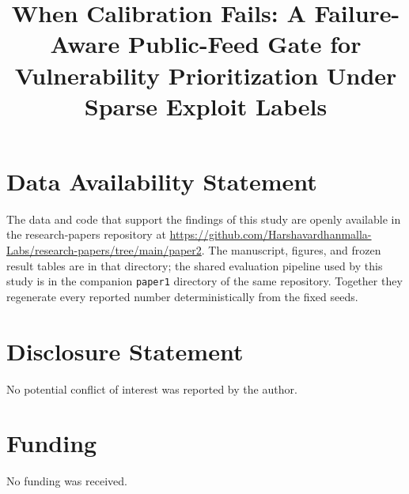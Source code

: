 \documentclass[journal]{IEEEtran}
\title{When Calibration Fails: A Failure-Aware Public-Feed Gate for
Vulnerability Prioritization Under Sparse Exploit Labels}
\author{%
  \IEEEauthorblockN{Harshavardhan Malla}
  \IEEEauthorblockA{Independent Researcher\\
  harshavardhanmalla75@gmail.com}%
}
\begin{document}
\maketitle





















\section*{Data Availability Statement}
The data and code that support the findings of this study are openly available in the research-papers repository at \url{https://github.com/Harshavardhanmalla-Labs/research-papers/tree/main/paper2}. The manuscript, figures, and frozen result tables are in that directory; the shared evaluation pipeline used by this study is in the companion \texttt{paper1} directory of the same repository. Together they regenerate every reported number deterministically from the fixed seeds.

\section*{Disclosure Statement}
No potential conflict of interest was reported by the author.

\section*{Funding}
No funding was received.
\end{document}
